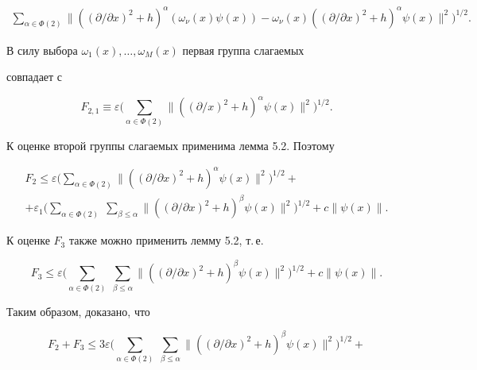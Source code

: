 \begin{pf}
\begin{multline*}
\sum_{\alpha\in\Phi(2)}\|((\partial/\partial x)^2+h)^\alpha 


(\omega_\nu(x)\psi(x))-\omega_\nu(x) 


((\partial/\partial x)^2+h)^\alpha\psi(x)\|^2\bigg)^{1/2}. 


\end{multline*} 


В силу выбора $\omega_1(x),\dotsc,\omega_M(x)$ первая группа слагаемых 


совпадает с 


$$ 


F_{2,1}\equiv\varepsilon\bigg(\sum_{\alpha\in\Phi(2)} 


\|((\partial/ x)^2+h)^\alpha\psi(x)\|^2\bigg)^{1/2}. 


$$ 


К оценке второй группы слагаемых применима лемма 5.2. Поэтому 


\begin{multline} 


F_2\le\varepsilon\bigg( 


\sum_{\alpha\in\Phi(2)}\|((\partial/\partial x)^2+h)^\alpha 


\psi(x)\|^2\bigg)^{1/2}+ \\


+\varepsilon_1\bigg( 


\sum_{\alpha\in\Phi(2)}\;\sum_{\beta\le\alpha} 


\|((\partial/\partial x)^2+h)^\beta\psi(x)\|^2\bigg)^{1/2} 


+c\|\psi(x)\|. 


\end{multline} 


К оценке $F_3$ также можно применить лемму 5.2, т.\,е. 


$$ 


F_3\le\varepsilon\bigg( 


\sum_{\alpha\in\Phi(2)}\;\sum_{\beta\le\alpha}\|(( 


\partial/\partial x)^2+h)^\beta\psi(x)\|^2\bigg)^{1/2}+c\|\psi(x)\|. 


$$ 


Таким образом, доказано, что 


\begin{equation} 


F_2+F_3\le 3\varepsilon\bigg( 


\sum_{\alpha\in\Phi(2)}\;\sum_{\beta\le\alpha} 


\|((\partial/\partial x)^2+h)^\beta\psi(x)\|^2\bigg)^{1/2}+ 



\end{equation}
\end{pf}
